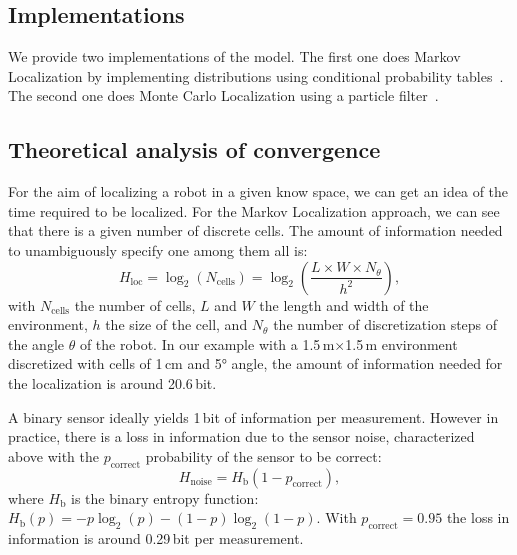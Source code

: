 \documentclass[letterpaper, 10pt, conference]{ieeeconf}
\begin{document}
\subsection{Implementations}

We provide two implementations of the model.
The first one does Markov Localization by implementing distributions using conditional probability tables~\cite{fox1999markov}.
The second one does Monte Carlo Localization using a particle filter~\cite{dellaert1999monte}.

\subsection{Theoretical analysis of convergence}
\label{sec:theoreticalconv}

For the aim of localizing a robot in a given know space, we can get an idea of the time required to be localized.
For the Markov Localization approach, we can see that there is a given number of discrete cells.
The amount of information needed to unambiguously specify one among them all is:
\begin{displaymath}
	H_\mathrm{loc} = \log_2(N_\mathrm{cells}) = \log_2\left(\frac{L\times W\times N_{\theta}}{h^2}\right),
\end{displaymath}
with $N_\mathrm{cells}$ the number of cells, $L$ and $W$ the length and width of the environment, $h$ the size of the cell, and $N_{\theta}$ the number of discretization steps of the angle $\theta$ of the robot.
In our example with a 1.5\,m$\times$1.5\,m environment discretized with cells of 1\,cm and 5° angle, the amount of information needed for the localization is around 20.6\,bit.

A binary sensor ideally yields 1\,bit of information per measurement.
However in practice, there is a loss in information due to the sensor noise, characterized above with the $p_\mathrm{correct}$ probability of the sensor to be correct:
\begin{displaymath}
	H_\mathrm{noise} = H_{\text{b}}(1 - p_\mathrm{correct}),
\end{displaymath}
where $H_{\text{b}}$ is the binary entropy function: $H_{\text{b}}(p) = -p\log_2(p) - (1-p)\log_2(1-p)$.
With $p_\mathrm{correct}=0.95$ the loss in information is around 0.29\,bit per measurement.
\end{document}

